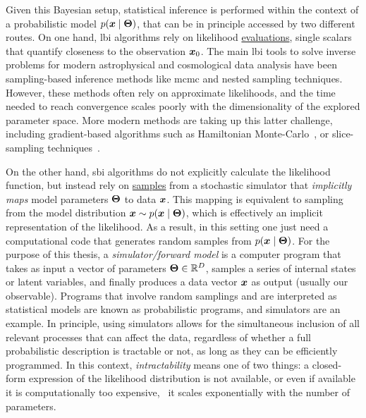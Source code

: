 Given this Bayesian setup, statistical inference is performed within the context of a probabilistic model $p(\bm{x}\mid\bm{\Theta})$, that can be in principle accessed by two different routes. On one hand, \gls*{lbi} algorithms rely on likelihood \underline{evaluations}, single scalars that quantify closeness to the observation $\bm{x}_0$. The main \gls*{lbi} tools to solve inverse problems for modern astrophysical and cosmological data analysis have been sampling-based inference methods like \gls*{mcmc} \citep{Metropolis:1953am, Hastings:1970aa} and nested sampling \citep{Skilling:2006gxv, Feroz:2008xx, Handley:2015fda} techniques. However, these methods often rely on approximate likelihoods, and the time needed to reach convergence scales poorly with the dimensionality of the explored parameter space. More modern methods are taking up this latter challenge, including gradient-based algorithms such as Hamiltonian Monte-Carlo~\citep{Duane:1987de}, or slice-sampling techniques~\citep{Neal:aa, Handley:2015fda}.

On the other hand, \gls*{sbi} algorithms do not explicitly calculate the likelihood function, but instead rely on \underline{samples} from a stochastic simulator that  \emph{implicitly maps} model parameters $\bm{\Theta}$ to data $\bm{x}$. This mapping is equivalent to sampling from the model distribution $\bm{x} \sim p(\bm{x}\mid\bm{\Theta})$, which is effectively an implicit representation of the likelihood. As a result, in this setting one just need a computational code that generates random samples from $p(\bm{x}\mid\bm{\Theta})$. For the purpose of this thesis, a \emph{simulator/forward model} is a computer program that takes as input a vector of parameters $\bm{\Theta} \in \mathbb{R}^D$, samples a series of internal states or latent variables, and finally produces a data vector  $\bm{x}$  as output (usually our observable). Programs that involve random samplings and are interpreted as statistical models are known as probabilistic programs, and simulators are an example. In principle, using simulators allows for the simultaneous inclusion of all relevant processes that can affect the data, regardless of whether a full probabilistic description is tractable or not, as long as they can be efficiently programmed. In this context, \emph{intractability} means one of two things: a closed-form expression of the likelihood distribution is not available, or even if available it is computationally too expensive, \eg\ it scales exponentially with the number of parameters.

